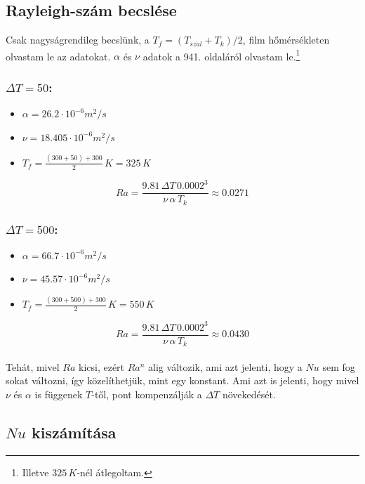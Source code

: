 \documentclass[a4paper, 10pt, oneside]{article}
\begin{document}
\subsection{Rayleigh-szám becslése}

Csak nagyságrendileg becslünk, a $T_{f} = (T_{sz\acute{a}l}+T_k)/2$, film hőmérsékleten olvastam le az adatokat.
$\alpha$ és $\nu$ adatok a \cite{heat_and_mass} 941. oldaláról olvastam le.\footnote{Illetve $325\, K$-nél átlegoltam.}

\subsubsection*{$\Delta T = 50$:}

\begin{itemize}
	\item $\alpha = 26.2 \cdot 10^{-6} m^2/s$
	\item $\nu = 18.405 \cdot 10^{-6} m^2/s$
	\item $T_f = \frac{(300+50) + 300}{2}\, K = 325\, K$
\end{itemize}

\[
Ra = \frac{9.81\, \Delta T\, 0.0002^3}{\nu\, \alpha\, T_k} \approx 0.0271
\]

\subsubsection*{$\Delta T = 500$:}

\begin{itemize}
	\item $\alpha = 66.7 \cdot 10^{-6} m^2/s$
	\item $\nu = 45.57 \cdot 10^{-6} m^2/s$
	\item $T_f = \frac{(300+500) + 300}{2}\, K = 550\, K$
\end{itemize}

\[
Ra = \frac{9.81\, \Delta T\, 0.0002^3}{\nu\, \alpha\, T_k} \approx 0.0430
\]
\\
Tehát, mivel $Ra$ kicsi, ezért $Ra^n$ alig változik, 
 ami azt jelenti, hogy a $Nu$ sem fog sokat változni, így közelíthetjük, 
mint egy konstant. Ami azt is jelenti, hogy mivel $\nu$ és $\alpha$ is függenek $T$-től, pont 
kompenzálják a $\Delta T$ növekedését.\\



\subsection{$Nu$ kiszámítása}
\end{document}
